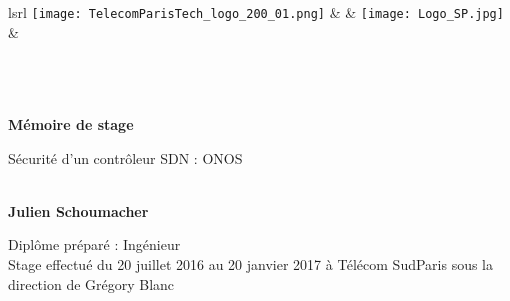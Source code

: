 \begin{titlepage}
	\begin{tabularx}{\textwidth}{lsrl}
		\texttt{[image: TelecomParisTech\_logo\_200\_01.png]}
		&
    	&
		\texttt{[image: Logo\_SP.jpg]}
		&
	\end{tabularx}

    \begin{center}
        \vspace*{1cm}
        
        \Huge
       	~\\
       	~\\
       	~\\
        \textbf{Mémoire de stage}
        
        \vspace{0.5cm}
        \LARGE
        Sécurité d'un contrôleur SDN : ONOS\\
        ~\\
        
        \vspace{1.5cm}
        
        \textbf{Julien Schoumacher}
        
        \vfill
       
        \begin{flushleft}
       		 Diplôme préparé : Ingénieur\\
        	 Stage effectué du 20 juillet 2016 au 20 janvier 2017 à Télécom SudParis sous la direction de Grégory Blanc
        \end{flushleft}
        \vspace{0.3cm}
        
    \end{center}
\end{titlepage}